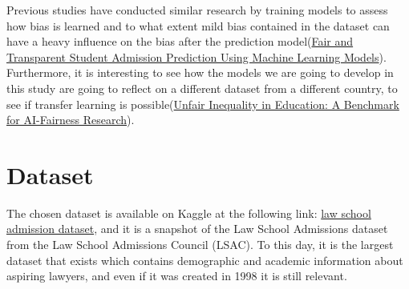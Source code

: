 \documentclass{article}
\begin{document}
Previous studies have conducted similar research by training models to assess how bias is learned and to what extent mild bias contained in the dataset can have a heavy influence on the bias after the prediction model(\href{https://www.researchgate.net/publication/387044808_Fair_and_Transparent_Student_Admission_Prediction_Using_Machine_Learning_Models#read}{Fair and Transparent Student Admission Prediction Using Machine Learning Models}). Furthermore, it is interesting to see how the models we are going to develop in this study are going to reflect on a different dataset from a different country, to see if transfer learning is possible(\href{paper-2024-ull-dataset-benchmark.pdf}{Unfair Inequality in Education: A Benchmark for AI-Fairness Research}).



\section{Dataset}
The chosen dataset is available on Kaggle at the following link: 
\href{https://www.kaggle.com/datasets/danofer/law-school-admissions-bar-passage/data}{law school admission dataset}, and it is a snapshot of the  Law School Admissions dataset from the Law School Admissions Council (LSAC). To this day, it is the largest dataset that exists which contains demographic and academic information about aspiring lawyers, and even if it was created in 1998 it is still relevant. 
\end{document}
